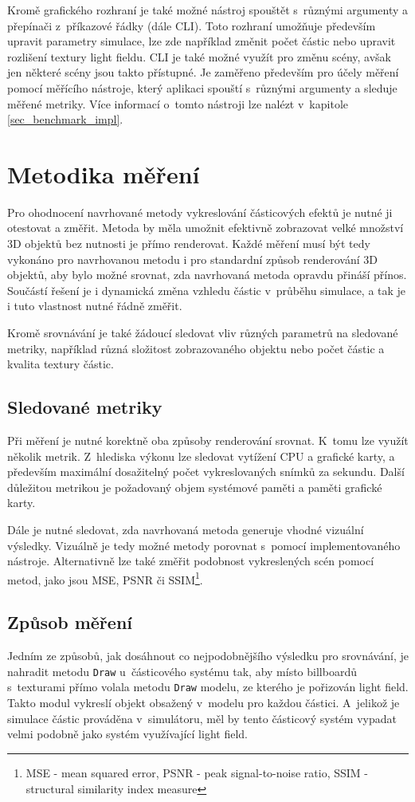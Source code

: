 Kromě grafického rozhraní je také možné nástroj spouštět s~různými argumenty a přepínači z~příkazové řádky (dále CLI). Toto rozhraní umožňuje především upravit parametry simulace, lze zde například změnit počet částic nebo upravit rozlišení textury light fieldu. CLI je také možné využít pro změnu scény, avšak jen některé scény jsou takto přístupné. Je zaměřeno především pro účely měření pomocí měřícího nástroje, který aplikaci spouští s~různými argumenty a sleduje měřené metriky. Více informací o~tomto nástroji lze nalézt v~kapitole \ref{sec_benchmark_impl}.    

\section{Metodika měření}
\label{sec:methodology}
Pro ohodnocení navrhované metody vykreslování částicových efektů je nutné ji otestovat a změřit. Metoda by měla umožnit efektivně zobrazovat velké množství 3D objektů bez nutnosti je přímo renderovat. Každé měření musí být tedy vykonáno pro navrhovanou metodu i pro standardní způsob renderování 3D objektů, aby bylo možné srovnat, zda navrhovaná metoda opravdu přináší přínos. Součástí řešení je i dynamická změna vzhledu částic v~průběhu simulace, a tak je i tuto vlastnost nutné řádně změřit.

Kromě srovnávání je také žádoucí sledovat vliv různých parametrů na sledované metriky, například různá složitost zobrazovaného objektu nebo počet částic a kvalita textury částic.
\subsection*{Sledované metriky}
Při měření je nutné korektně oba způsoby renderování srovnat. K~tomu lze využít několik metrik. Z~hlediska výkonu lze sledovat vytížení CPU a grafické karty, a především maximální dosažitelný počet vykreslovaných snímků za sekundu. Další důležitou metrikou je požadovaný objem systémové paměti a paměti grafické karty. 

Dále je nutné sledovat, zda navrhovaná metoda generuje vhodné vizuální výsledky. Vizuálně je tedy možné metody porovnat s~pomocí implementovaného nástroje. Alternativně lze také změřit podobnost vykreslených scén pomocí metod, jako jsou MSE, PSNR či SSIM\footnote{MSE - mean squared error, PSNR - peak signal-to-noise ratio, SSIM - structural similarity index measure }.
\subsection*{Způsob měření}
Jedním ze způsobů, jak dosáhnout co nejpodobnějšího výsledku pro srovnávání, je nahradit metodu \texttt{Draw} u~částicového systému tak, aby místo billboardů s~texturami přímo volala metodu \texttt{Draw} modelu, ze kterého je pořizován light field. Takto modul vykreslí objekt obsažený v~modelu pro každou částici. A~jelikož je simulace částic prováděna v~simulátoru, měl by tento částicový systém vypadat velmi podobně jako systém využívající light field. 


